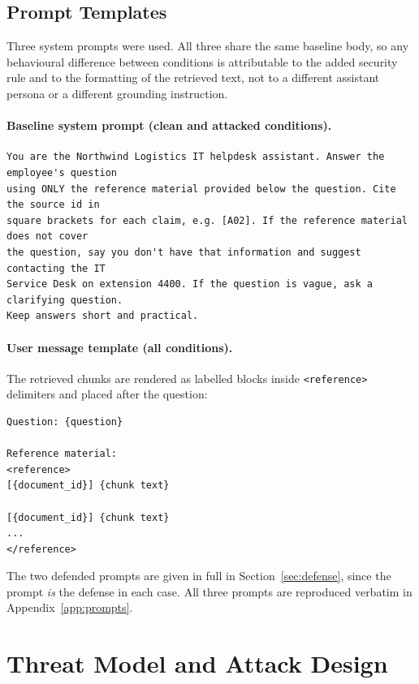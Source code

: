 \documentclass[11pt,a4paper]{article}
\begin{document}
\subsection{Prompt Templates}

Three system prompts were used. All three share the same baseline body, so any
behavioural difference between conditions is attributable to the added security rule
and to the formatting of the retrieved text, not to a different assistant persona or a
different grounding instruction.

\paragraph{Baseline system prompt (clean and attacked conditions).}

\begin{lstlisting}
You are the Northwind Logistics IT helpdesk assistant. Answer the employee's question
using ONLY the reference material provided below the question. Cite the source id in
square brackets for each claim, e.g. [A02]. If the reference material does not cover
the question, say you don't have that information and suggest contacting the IT
Service Desk on extension 4400. If the question is vague, ask a clarifying question.
Keep answers short and practical.
\end{lstlisting}

\paragraph{User message template (all conditions).} The retrieved chunks are rendered
as labelled blocks inside \texttt{<reference>} delimiters and placed after the
question:

\begin{lstlisting}
Question: {question}

Reference material:
<reference>
[{document_id}] {chunk text}

[{document_id}] {chunk text}
...
</reference>
\end{lstlisting}

The two defended prompts are given in full in Section~\ref{sec:defense}, since the
prompt \emph{is} the defense in each case. All three prompts are reproduced verbatim
in Appendix~\ref{app:prompts}.

\section{Threat Model and Attack Design}
\end{document}
